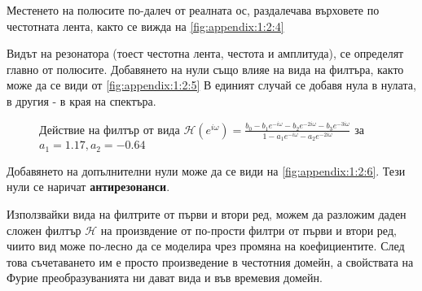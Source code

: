 \documentclass[main.tex]{subfiles}
\begin{document}
Местенето на полюсите по-далеч от реалната ос, раздалечава върховете по честотната лента, както се вижда на \autoref{fig:appendix:1:2:4}

Видът на резонатора (тоест честотна лента, честота и амплитуда), се определят главно от полюсите.
Добавянето на нули също влияе на вида на филтъра, както може да се види от \autoref{fig:appendix:1:2:5}
В единият случай се добавя нула в нулата, в другия - в края на спектъра. 

\begin{figure}[H]
    \centering
    \caption{Действие на филтър от вида $\mathcal{H}(e^{i \omega}) = \frac{b_0 - b_1 e^{-i \omega} -b_2 e^{-2 i \omega} -b_3 e^{-3 i \omega}}{1 - a_1e^{-i \omega} - a_2e^{-2i \omega}}$ за $a_1 = 1.17, a_2 = -0.64$}
    \label{fig:appendix:1:2:6}
\end{figure}

Добавянето на допълнителни нули може да се види на \autoref{fig:appendix:1:2:6}. Тези нули се наричат \textbf{антирезонанси}.


Използвайки вида на филтрите от първи и втори ред, можем да разложим даден сложен филтър
$\mathcal{H}$ на произвдение от по-прости филтри от първи и втори ред, чиито вид може
по-лесно да се моделира чрез промяна на коефициентите. След това съчетаването им е просто произведение в честотния домейн, а свойствата на Фурие
преобразуванията ни дават вида и във времевия домейн.
\end{document}
